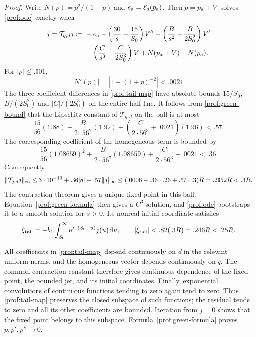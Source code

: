 \begin{proof}
Write $N(p)=p^2/(1+p)$ and $e_{\rm a}=\mathcal E_d(p_{\rm a})$.
Then $p=p_{\rm a}+V$ solves \eqref{prof:ode} exactly when
\begin{equation}\label{prof:tail-map}
 \begin{split}
 j=\mathcal T_{q,d}j:={}&-e_{\rm a}
 -\left(\frac{30}{s}-\frac{15}{S_0}\right)V''
 -\left(\frac B{s^2}-\frac B{2S_0^2}\right)V'\\
 &-\left(\frac C{s^3}-\frac C{2S_0^3}\right)V
 +N(p_{\rm a}+V)-N(p_{\rm a}).
 \end{split}
\end{equation}
For $|p|\le.001$,
\[
 |N'(p)|=|1-(1+p)^{-2}|<.0021.
\]
The three coefficient differences in \eqref{prof:tail-map} have absolute
bounds $15/S_0$, $B/(2S_0^2)$ and $|C|/(2S_0^3)$ on the entire half-line.
It follows from \eqref{prof:green-bound} that the Lipschitz constant of
$\mathcal T_{q,d}$ on the ball is at most
\begin{equation}\label{prof:tail-contraction-constant}
 \frac{15}{56}(1.88)+\frac{B}{2\cdot56^2}(1.92)
 +\left(\frac{|C|}{2\cdot56^3}+.0021\right)(1.96)<.57.
\end{equation}
The corresponding coefficient of the homogeneous term is bounded by
\begin{equation}\label{prof:tail-homogeneous-constant}
 \frac{15}{56}(1.08659)^2+\frac{B}{2\cdot56^2}(1.08659)
 +\frac{|C|}{2\cdot56^3}+.0021<.36.
\end{equation}
Consequently
\[
 \lVert \mathcal T_{q,d}j\rVert_\infty
 \le3\cdot10^{-13}+.36|q|+.57\lVert j\rVert_\infty
 \le(.0006+.36\cdot.26+.57\cdot.3)R=.2652R<.3R.
\]
The contraction theorem gives a unique fixed point in this ball.
Equation~\eqref{prof:green-formula} then gives a $C^3$ solution, and
\eqref{prof:ode} bootstraps it to a smooth solution for $s>0$.
Its nonreal initial coordinate satisfies
\[
 \xi_{\rm tail}=-b_1\int_{S_0}^\infty
                  \mathrm{e}^{\lambda_1(S_0-u)}j(u)\,\mathrm{d} u,
 \qquad |\xi_{\rm tail}|<.82(.3R)=.246R<.25R.
\]

All coefficients in \eqref{prof:tail-map} depend continuously on $d$
in the relevant uniform norms, and the homogeneous vector depends
continuously on $q$.  The common contraction constant therefore gives
continuous dependence of the fixed point, the bounded jet, and its
initial coordinates.  Finally, exponential convolutions of continuous
functions tending to zero again tend to zero.  Thus
\eqref{prof:tail-map} preserves the closed subspace of such functions;
the residual tends to zero and all its other coefficients are bounded.
Iteration from $j=0$ shows that the fixed point belongs to this subspace.
Formula~\eqref{prof:green-formula} proves $p,p',p''\to0$.
\end{proof}

